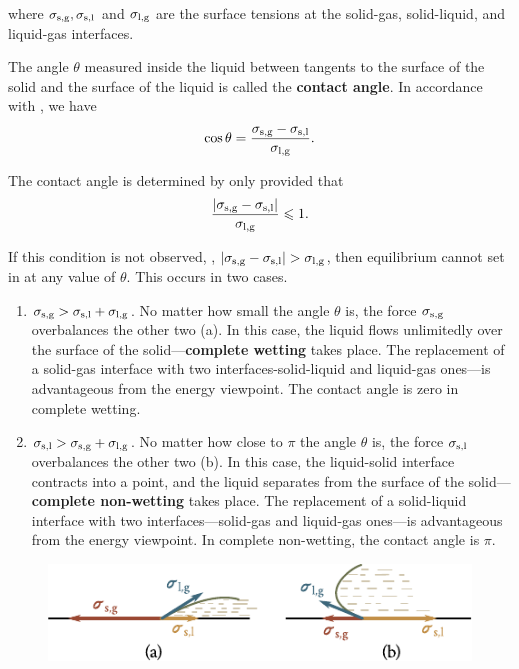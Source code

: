 \noindent
where $\sigma_{\text{s,g}}, \sigma_{\text{s,l}}$ and $\sigma_{\text{l,g}}$ are the surface tensions at the solid-gas, solid-liquid, and liquid-gas interfaces.

The angle $\theta$ measured inside the liquid between tangents to the surface of the solid and the surface of the liquid is called the \textbf{contact angle}. In accordance with , we have
\begin{equation}\label{eq:14_6}
	\cos\theta = \frac{\sigma_{\text{s,g}} - \sigma_{\text{s,l}}}{\sigma_{\text{l,g}}}.
\end{equation}

\noindent
The contact angle is determined by  only provided that
\begin{equation}\label{eq:14_7}
	\frac{|\sigma_{\text{s,g}} - \sigma_{\text{s,l}}|}{\sigma_{\text{l,g}}} \leqslant 1.
\end{equation}

\noindent
If this condition is not observed, \ie, $|\ab{\sigma}{s,g} - \ab{\sigma}{s,l}|>\ab{\sigma}{l,g}$, then equilibrium cannot set in at any value of $\theta$. This occurs in two cases.
\begin{enumerate}[1.]
	\item $\sigma_{\text{s,g}}>\sigma_{\text{s,l}}+\sigma_{\text{l,g}}$. No matter how small the angle $\theta$ is, the	force $\sigma_{\text{s,g}}$ overbalances the other two (a). In this case, the liquid flows unlimitedly over the surface of the solid---\textbf{complete wetting} takes place. The replacement of a solid-gas interface with two interfaces-solid-liquid and liquid-gas ones---is advantageous from the energy viewpoint. The contact angle is zero in complete wetting.
	
	\item $\sigma_{\text{s,l}}>\sigma_{\text{s,g}}+\sigma_{\text{l,g}}$. No matter how close to $\pi$ the angle $\theta$ is, the force $\sigma_{\text{s,l}}$ overbalances the other two (b). In this case, the liquid-solid interface contracts into a point, and the liquid separates from the surface of the solid---\textbf{complete non-wetting} takes place. The replacement of a solid-liquid interface with two interfaces---solid-gas and liquid-gas ones---is advantageous from the energy viewpoint. In complete non-wetting, the contact angle is $\pi$.
\end{enumerate}

\begin{figure}[t]
	\begin{center}
		\includegraphics[scale=1.1]{figures/ch_14/fig_14_8.pdf}
		\caption[]{}
		\label{fig:14_8}
	\end{center}
	\vspace{-0.75cm}
\end{figure}

